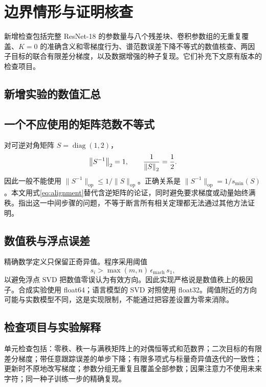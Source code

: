 \section{边界情形与证明核查}
新增检查包括完整 ResNet-18 的参数量与八个残差块、卷积参数组的无重复覆盖、$K=0$ 的准确含义和零梯度行为、谱范数误差下降不等式的数值核查、两因子目标的联合有限差分梯度，以及数据增强的种子复现。它们补充下文原有版本的检查项目。
\subsection{新增实验的数值汇总}
\begin{table}[htbp]\centering\small
\caption{新增病态矩阵分解的末点指标，三个种子的均值与样本标准差。}

\end{table}
\begin{table}[htbp]\centering\small
\caption{ResNet-18 的 $K$ 消融数值。学习率固定为 $K=5$ 试跑选定值，其余训练设置完全相同。}

\end{table}
\subsection{一个不应使用的矩阵范数不等式}
对可逆对角矩阵 $S=\operatorname{diag}(1,2)$，
\begin{equation}
 \left\lVert S^{-1}\right\rVert_2=1,\qquad \frac1{\left\lVert S\right\rVert_2}=\frac12.
\end{equation}
因此一般不能使用 $\|S^{-1}\|_{\mathrm{op}}\leq1/\|S\|_{\mathrm{op}}$。正确关系是 $\|S^{-1}\|_{\mathrm{op}}=1/s_{\min}(S)$。本文用式\eqref{eq:alignment}替代含逆矩阵的论证，同时避免要求梯度或动量始终满秩。指出这一中间步骤的问题，不等于断言所有相关定理都无法通过其他方法证明。

\subsection{数值秩与浮点误差}
精确数学定义只保留正奇异值。程序采用阈值
\begin{equation}
 s_i>\max(m,n)\,\epsilon_{\mathrm{mach}}\,s_1,
\end{equation}
以避免浮点 SVD 把数值零误认为有效方向。因此实现严格说是数值秩上的极因子。合成实验使用 float64；语言模型的 SVD 对照使用 float32。阈值附近的方向可能与实数模型不同，这是实现限制，不能通过把容差设置为零来消除。

\subsection{检查项目与实验解释}
单元检查包括：零秩、秩一与满秩矩阵上的对偶恒等式和范数界；二次目标的有限差分梯度；带任意跟踪误差的单步下降；有限多项式与标量奇异值迭代的一致性；更新时不原地改写梯度；参数分组无重复且覆盖全部参数；因果注意力不使用未来字符；同一种子训练一步的精确复现。

